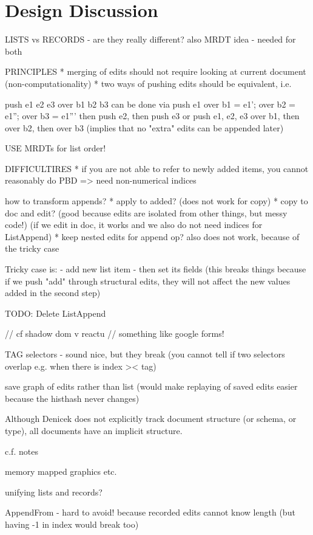 \documentclass[sigconf,anonymous,screen]{acmart}
\begin{document}
\section{Design Discussion}
\label{sec:discuss}

LISTS vs RECORDS
- are they really different? also MRDT idea - needed for both

PRINCIPLES
* merging of edits should not require looking at current document (non-computationality)
* two ways of pushing edits should be equivalent, i.e.

push e1 e2 e3 over b1 b2 b3 can be done via
  push e1 over b1 = e1'; over b2 = e1''; over b3 = e1'''
  then push e2, then push e3
or
  push e1, e2, e3 over b1, then over b2, then over b3
(implies that no "extra" edits can be appended later)

USE MRDTs for list order!

DIFFICULTIRES
* if you are not able to refer to newly added items, you cannot reasonably do PBD
  => need non-numerical indices

how to transform appends?
* apply to added? (does not work for copy)
* copy to doc and edit? (good because edits are isolated from other things, but messy code!)
(if we edit in doc, it works and we also do not need indices for ListAppend)
* keep nested edits for append op? also does not work, because of the tricky case

Tricky case is:
- add new list item
- then set its fields
  (this breaks things because if we push "add" through structural edits, they will not affect the new values added in the second step)

TODO: Delete ListAppend

// cf shadow dom v reactu
// something like google forms!


TAG selectors - sound nice, but they break
(you cannot tell if two selectors overlap e.g. when there is index >< tag)

save graph of edits rather than list
(would make replaying of saved edits easier because the histhash never changes)

Although Denicek does not explicitly track document structure (or schema, or type), all documents
have an implicit structure.

c.f. notes

memory mapped graphics etc.

unifying lists and records?

AppendFrom - hard to avoid! because recorded edits cannot know length
(but having -1 in index would break too)
\end{document}
